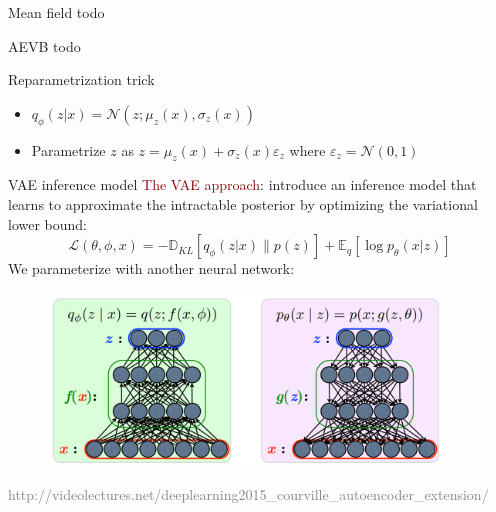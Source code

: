 \documentclass[unicode,11pt]{beamer}
\begin{document}
\begin{frame}[fragile]{Mean field}
todo 
\end{frame}

\begin{frame}[fragile]{AEVB}
todo
\end{frame}

\begin{frame}[fragile]{Reparametrization trick}

\begin{itemize}
  \item $q_\phi(z|x) = \mathcal{N}(z; \mu_z(x), \sigma_z(x))$
  \item Parametrize $z$ as $z = \mu_z(x) + \sigma_z(x)\varepsilon_z$ where $\varepsilon_z = \mathcal{N}(0, 1)$ 
\end{itemize}

\end{frame}


\begin{frame}[fragile]{VAE inference model}
\textcolor{darkred}{The VAE approach}: introduce an inference model that
learns to approximate the intractable posterior by
optimizing the variational lower bound: 
$$ \mathcal{L}(\theta, \phi, x) = -\mathbb{D}_{KL}[q_{\phi} (z|x) \parallel p(z)] + \mathbb{E}_q [\log p_\theta (x|z)] $$
We parameterize with another neural network:
\begin{figure}[htbp]
  \includegraphics[height=130pt, keepaspectratio = true]{images/vae}   
\end{figure}
\tiny \textcolor{gray}{http://videolectures.net/deeplearning2015\_courville\_autoencoder\_extension/}
\end{frame}
\end{document}
